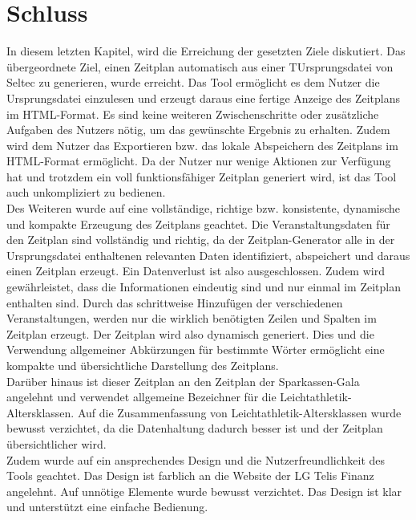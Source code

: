 
\chapter{Schluss}
\label{chap:Schluss}

In diesem letzten Kapitel, wird die Erreichung der gesetzten Ziele diskutiert.
Das übergeordnete Ziel, einen Zeitplan automatisch aus einer TUrsprungsdatei von Seltec zu generieren, wurde erreicht. Das Tool ermöglicht es dem Nutzer die Ursprungsdatei einzulesen und erzeugt daraus eine fertige Anzeige des Zeitplans im HTML-Format. Es sind keine weiteren Zwischenschritte oder zusätzliche Aufgaben des Nutzers nötig, um das gewünschte Ergebnis zu erhalten. Zudem wird dem Nutzer das Exportieren bzw. das lokale Abspeichern des Zeitplans im HTML-Format ermöglicht. Da der Nutzer nur wenige Aktionen zur Verfügung hat und trotzdem ein voll funktionsfähiger Zeitplan generiert wird, ist das Tool auch unkompliziert zu bedienen.\\
Des Weiteren wurde auf eine vollständige, richtige bzw. konsistente, dynamische und kompakte Erzeugung des Zeitplans geachtet. Die Veranstaltungsdaten für den Zeitplan sind vollständig und richtig, da der Zeitplan-Generator alle in der Ursprungsdatei enthaltenen relevanten Daten identifiziert, abspeichert und daraus einen Zeitplan erzeugt. Ein Datenverlust ist also ausgeschlossen. Zudem wird gewährleistet, dass die Informationen eindeutig sind und nur einmal im Zeitplan enthalten sind. Durch das schrittweise Hinzufügen der verschiedenen Veranstaltungen, werden nur die wirklich benötigten Zeilen und Spalten im Zeitplan erzeugt. Der Zeitplan wird also dynamisch generiert. Dies und die Verwendung allgemeiner Abkürzungen für bestimmte Wörter ermöglicht eine kompakte und übersichtliche Darstellung des Zeitplans.\\
Darüber hinaus ist dieser Zeitplan an den Zeitplan der Sparkassen-Gala angelehnt und verwendet allgemeine Bezeichner für die Leichtathletik-Altersklassen. Auf die Zusammenfassung von Leichtathletik-Altersklassen wurde bewusst verzichtet, da die Datenhaltung dadurch besser ist und der Zeitplan übersichtlicher wird.\\
Zudem wurde auf ein ansprechendes Design und die Nutzerfreundlichkeit des Tools geachtet. Das Design ist farblich an die Website der LG Telis Finanz angelehnt. Auf unnötige Elemente wurde bewusst verzichtet. Das Design ist klar und unterstützt eine einfache Bedienung.\\
